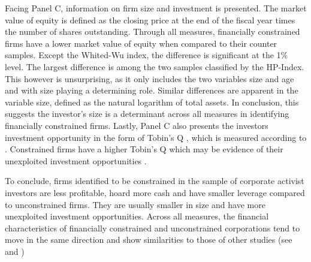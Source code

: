 \documentclass[12pt]{article}
\begin{document}
Facing Panel C, information on firm size and investment is presented. The market value of equity is defined as the closing price at the end of the fiscal year times the number of shares outstanding. Through all measures, financially constrained firms have a lower market value of equity when compared to their counter samples. Except the Whited-Wu index, the difference is significant at the 1\% level. The largest difference is among the two samples classified by the HP-Index. This however is unsurprising, as it only includes the two variables size and age and with size playing a determining role. Similar differences are apparent in the variable size, defined as the natural logarithm of total assets. In conclusion, this suggests the investor's size is a determinant across all measures in identifying financially constrained firms. Lastly, Panel C also presents the investors investment opportunity in the form of Tobin's Q \citep[p.1441]{MacKay2005}, which is measured according to \citet[p.1]{Khatami2014}. Constrained firms have a higher Tobin's Q which may be evidence of their unexploited investment opportunities \citep[p.539]{Whited2006}.

To conclude, firms identified to be constrained in the sample of corporate activist investors are less profitable, hoard more cash and have smaller leverage compared to unconstrained firms. They are usually smaller in size and have more unexploited investment opportunities. Across all measures, the financial characteristics of financially constrained and unconstrained corporations tend to move in the same direction and show similarities to those of other studies (see \citet[p.544]{Whited2006} and \citet[p.1917]{hadlock2010})
\end{document}
